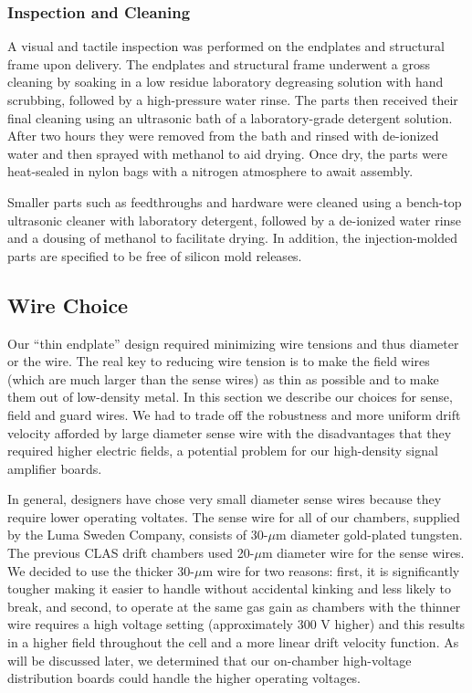 \subsubsection{Inspection and Cleaning}

A visual and tactile inspection was performed on the endplates and 
structural frame upon delivery.  The endplates and structural 
frame underwent a gross cleaning by soaking in a low residue laboratory 
degreasing solution with hand scrubbing, followed by a high-pressure water 
rinse. The parts then received their final cleaning using an ultrasonic 
bath of a laboratory-grade detergent solution.  After two hours they were
removed from the bath and rinsed with de-ionized water and then sprayed 
with methanol to aid drying. Once dry, the parts were heat-sealed in nylon 
bags with a nitrogen atmosphere to await assembly.

Smaller parts such as feedthroughs and hardware were cleaned using a 
bench-top ultrasonic cleaner with laboratory detergent, followed by a 
de-ionized water rinse and a dousing of methanol to facilitate drying.  
In addition, the injection-molded parts are specified to be free of silicon 
mold releases.



\subsection{Wire Choice}
\hskip 0.15in

Our ``thin endplate'' design required minimizing wire tensions and
thus diameter or the wire.  The real key to reducing wire tension is to
make the field wires (which are much larger than the sense wires) as 
thin as possible and to make them out of low-density metal.  In this 
section we describe our choices for sense, field and guard wires.
We had to trade off the robustness and more uniform drift velocity
afforded by large diameter sense wire with the disadvantages that they
required higher electric fields, a potential problem for our high-density
signal amplifier boards.

In general, designers have chose very small diameter sense wires because they
require lower operating voltates.
The sense wire for all of our chambers, supplied by the Luma
Sweden Company, consists of 30-$\mu$m diameter gold-plated tungsten.  
The previous CLAS drift chambers used 20-$\mu$m diameter wire for the
sense wires.  We decided to use the thicker 30-$\mu$m wire for two 
reasons: first, it is significantly tougher making it easier to handle without
accidental kinking and less likely to break, and second, to operate at the same 
gas gain as chambers with the thinner wire requires a high voltage setting 
(approximately 300 V higher) and this results in a higher field throughout the cell
and a more linear drift velocity function.  As will be discussed later,
we determined that our on-chamber high-voltage distribution boards could
handle the higher operating voltages.

